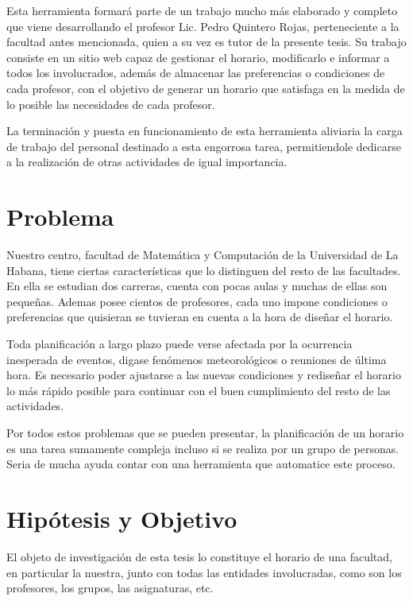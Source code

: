 \begin{introduction}
Esta herramienta formará parte de un trabajo mucho más elaborado y completo que viene desarrollando
el profesor Lic. Pedro Quintero Rojas, perteneciente a la facultad antes mencionada, quien a su vez
es tutor de la presente tesis. Su trabajo consiste en un sitio web capaz de gestionar el horario,
modificarlo e informar a todos los involucrados, además de almacenar las preferencias o condiciones
de cada profesor, con el objetivo de generar un horario que satisfaga en la medida de lo posible
las necesidades de cada profesor.

La terminación y puesta en funcionamiento de esta herramienta aliviaria la carga de trabajo del
personal destinado a esta engorrosa tarea, permitiendole dedicarse a la realización de otras
actividades de igual importancia.

\section*{Problema}

Nuestro centro, facultad de Matemática y Computación de la Universidad de La Habana, tiene ciertas
características que lo distinguen del resto de las facultades. En ella se estudian dos carreras,
cuenta con pocas aulas y muchas de ellas son pequeñas. Ademas posee cientos de profesores, cada uno
impone condiciones o preferencias que quisieran se tuvieran en cuenta a la hora de diseñar el horario.

Toda planificación a largo plazo puede verse afectada por la ocurrencia inesperada de eventos,
digase fenómenos meteorológicos o reuniones de última hora. Es necesario poder ajustarse a las nuevas
condiciones y rediseñar el horario lo más rápido posible para continuar con el buen cumplimiento del
resto de las actividades.

Por todos estos problemas que se pueden presentar, la planificación de un horario es una tarea sumamente 
compleja incluso si se realiza por un grupo de personas. Seria de mucha ayuda contar con una herramienta
que automatice este proceso.

\section*{Hipótesis y Objetivo}

El objeto de investigación de esta tesis lo constituye el horario de una facultad, en particular la nuestra,
junto con todas las entidades involucradas, como son los profesores, los grupos, las asignaturas, etc.


\end{introduction}
